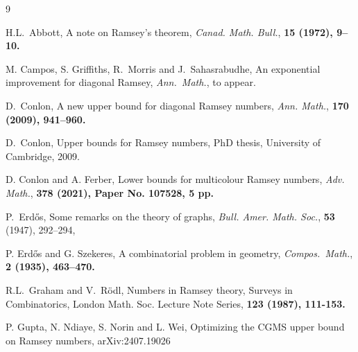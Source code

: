 \documentclass[12pt,reqno]{amsart}
\theoremstyle{definition}
\theoremstyle{remark}
\begin{document}
\begin{thebibliography}{9}

 H.L.~Abbott, A note on Ramsey's theorem, 
\emph{Canad. Math. Bull.}, \bf 15 \rm (1972), 9--10.



 M. Campos, S. Griffiths, R.~Morris and J.~Sahasrabudhe, 
An exponential improvement for diagonal Ramsey, \emph{Ann.~Math.}, to appear. %

 D.~Conlon, 
A new upper bound for diagonal Ramsey numbers, 
\emph{Ann. Math.},  \bf 170 \rm (2009), 941--960.

 D.~Conlon, 
Upper bounds for Ramsey numbers, 
PhD thesis, University of Cambridge, 2009.


 D. Conlon and A. Ferber, 
Lower bounds for multicolour Ramsey numbers, 
\emph{Adv. Math.}, \bf 378 \rm (2021), Paper No. 107528, 5 pp.




 P.~Erd\H{o}s, 
Some remarks on the theory of graphs, 
\emph{Bull. Amer. Math. Soc.}, \textbf{53} (1947), 292--294,

 P. Erd\H{o}s and G. Szekeres, 
A combinatorial problem in geometry, 
\emph{Compos.~Math.}, \bf 2 \rm (1935), 463--470.

 R.L.~Graham and V.~R\"odl, 
Numbers in Ramsey theory, 
Surveys in Combinatorics, London Math. Soc. Lecture Note Series, \bf 123 \rm (1987), 111-153.

 P. Gupta, N. Ndiaye, S. Norin and L. Wei, Optimizing the CGMS upper bound on Ramsey numbers, arXiv:2407.19026


\end{thebibliography}
\end{document}
